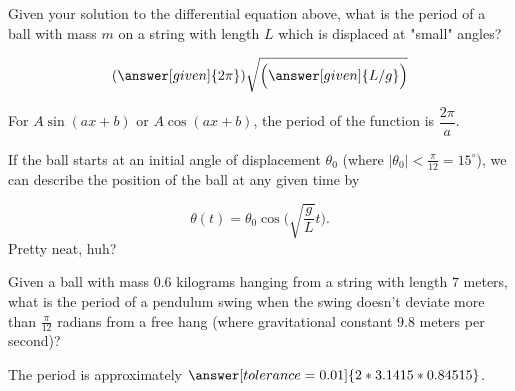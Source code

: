 \documentclass[handout,nooutcomes]{ximera}
\begin{document}
\begin{example}
\begin{explanation}
\begin{question}
Given your solution to the differential equation above, what is the period of a ball with mass $m$ on a string with length $L$ which is displaced at "small" angles?

\[
(\answer[given]{2\pi})\sqrt{\Big(\answer[given]{L/g}\Big)}
\]
\begin{hint}
For $A\sin(ax+b)$ or $A\cos(ax+b)$, the period of the function is $\dfrac{2\pi}{a}$.
\end{hint}
\end{question}

If the ball starts at an initial angle of displacement $\theta_0$
(where $|\theta_0|<\frac{\pi}{12}= 15^\circ$), we can describe
the position of the ball at any given time by

\[
\theta(t) = \theta_0 \cos\Big(\sqrt{\frac{g}{L}} t\Big).
\]
Pretty neat, huh?

\begin{question}
Given a ball with mass $0.6$ kilograms hanging from a string with length $7$ meters, what is the period of a pendulum swing when the swing doesn't deviate more than $\frac{\pi}{12}$ radians from a free hang (where gravitational constant $9.8$ meters per second)?


The period is approximately $\answer[tolerance=0.01]{2*3.1415*0.84515}$.

\end{question}




\end{explanation}
\end{example}
\end{document}
